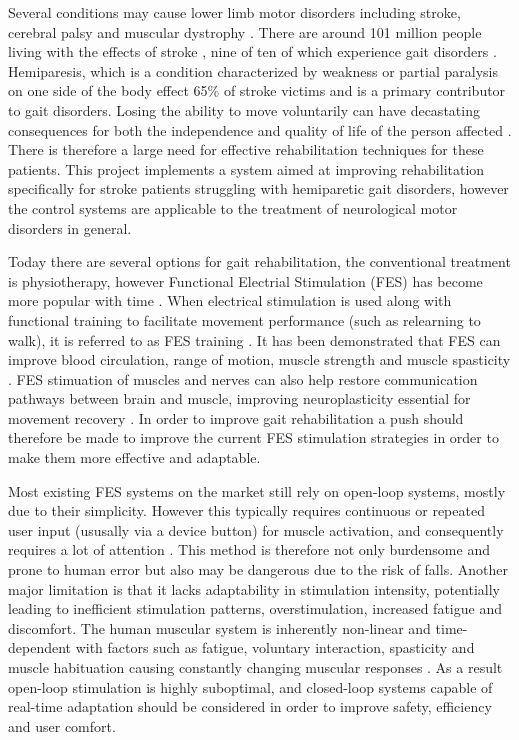 Several conditions may cause lower limb motor disorders including stroke, cerebral palsy and muscular dystrophy \cite{hayami_development_2022}. There are around 101 million people living with the effects of stroke \cite{noauthor_key_nodate}, nine of ten of which experience gait disorders \cite{schaechter_motor_2004}. Hemiparesis, which is a condition characterized by weakness or partial paralysis on one side of the body effect 65\% of stroke victims \cite{wist_muscle_2016} and is a primary contributor to gait disorders. Losing the ability to move voluntarily can have decastating consequences for both the independence and quality of life of the person affected \cite{marquez-chin_functional_2020}. There is therefore a large need for effective rehabilitation techniques for these patients. This project implements a system aimed at improving rehabilitation specifically for stroke patients struggling with hemiparetic gait disorders, however the control systems are applicable to the treatment of neurological motor disorders in general.

Today there are several options for gait rehabilitation, the conventional treatment is physiotherapy, however Functional Electrial Stimulation (FES) has become more popular with time \cite{muller_adaptive_2020}. When electrical stimulation is used along with functional training to facilitate movement performance (such as relearning to walk), it is referred to as FES training \cite{hayami_development_2022}. It has been demonstrated that FES can improve blood circulation, range of motion, muscle strength and muscle spasticity \cite{luo_review_2020}. FES stimuation of muscles and nerves can also help restore communication pathways between brain and muscle, improving neuroplasticity essential for movement recovery \cite{marquez-chin_functional_2020}. In order to improve gait rehabilitation a push should therefore be made to improve the current FES stimulation strategies in order to make them more effective and adaptable.

Most existing FES systems on the market still rely on open-loop systems, mostly due to their simplicity\cite{braz_functional_2009}. However this typically requires continuous or repeated user input (ususally via a device button) for muscle activation, and consequently requires a lot of attention \cite{hayami_development_2022}. This method is therefore not only burdensome and prone to human error but also may be dangerous due to the risk of falls. Another major limitation is that it lacks adaptability in stimulation intensity, potentially leading to inefficient stimulation patterns, overstimulation, increased fatigue and discomfort. The human muscular system is inherently non-linear and time-dependent with factors such as fatigue, voluntary interaction, spasticity and muscle habituation causing constantly changing muscular responses . As a result open-loop stimulation is highly suboptimal, and closed-loop systems capable of real-time adaptation should be considered in order to improve safety, efficiency and user comfort.

